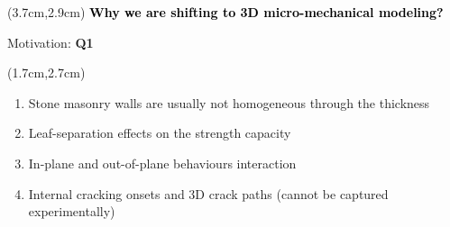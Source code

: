 \documentclass{EESD}
\begin{document}
\begin{frame}[t]{}
\begin{textblock*}{10cm}(3.7cm,2.9cm)
\Huge\textbf{\textcolor{black}{Why we are shifting to 3D micro-mechanical modeling?}}
\end{textblock*}
\end{frame}
\usebackgroundtemplate{}



\begin{frame}[t]{Motivation: \textcolor{myviolet}{{\textbf{Q1}}}}\vspace{10pt}
    \begin{textblock*}{13cm}(1.7cm,2.7cm)
    \begin{enumerate}
        \item Stone masonry walls are usually not homogeneous through the thickness\vspace{10pt}\pause
        \item Leaf-separation effects on the strength capacity\vspace{10pt}\pause
        \item In-plane and out-of-plane behaviours interaction\vspace{10pt}\pause
        \item Internal cracking onsets and 3D crack paths (cannot be captured experimentally)
    \end{enumerate}
    \end{textblock*}
\end{frame}
\end{document}
